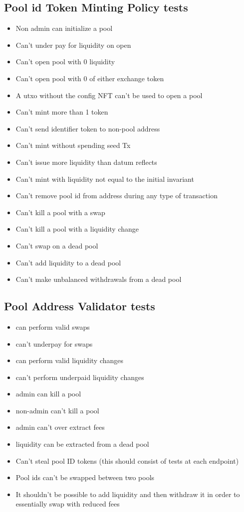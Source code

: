 \documentclass{article}
\begin{document}
\subsection{Pool id Token Minting Policy tests}

\begin{itemize}
	\item Non admin can initialize a pool
	\item Can't under pay for liquidity on open
	\item Can't open pool with 0 liquidity
	\item Can't open pool with 0 of either exchange token
	\item A utxo without the config NFT can't be used to open a pool
	\item Can't mint more than 1 token
	\item Can't send identifier token to non-pool address
	\item Can't mint without spending seed Tx
	\item Can't issue more liquidity than datum reflects
	\item Can't mint with liquidity not equal to the initial invariant
	\item Can't remove pool id from address during any type of transaction
	\item Can't kill a pool with a swap
	\item Can't kill a pool with a liquidity change
	\item Can't swap on a dead pool
	\item Can't add liquidity to a dead pool
	\item Can't make unbalanced withdrawals from a dead pool
\end{itemize}

\subsection{Pool Address Validator tests}

\begin{itemize}
	\item can perform valid swaps
	\item can't underpay for swaps
	\item can perform valid liquidity changes
	\item can't perform underpaid liquidity changes
	\item admin can kill a pool
	\item non-admin can't kill a pool
	\item admin can't over extract fees
	\item liquidity can be extracted from a dead pool
	\item Can't steal pool ID tokens (this should consist of tests at each endpoint)
	\item Pool ids can't be swapped between two pools
  \item It shouldn't be possible to add liquidity and then withdraw it in order to essentially swap with
    reduced fees
\end{itemize}
\end{document}
